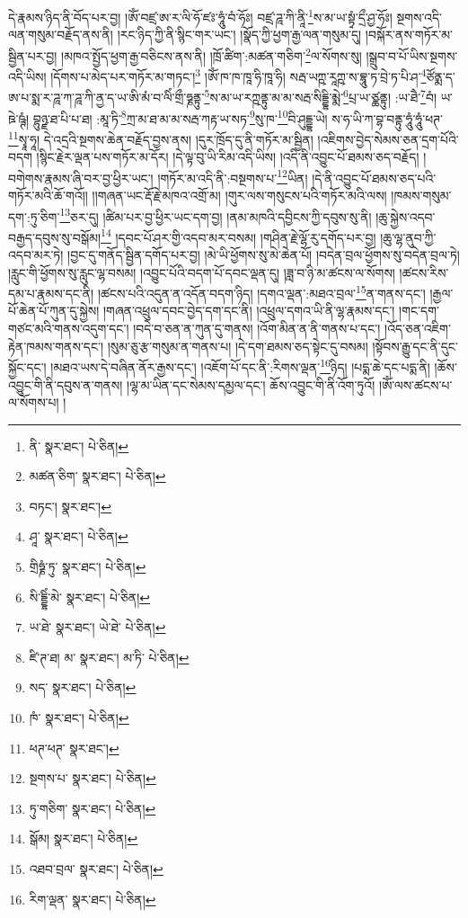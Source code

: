 དེ་རྣམས་ཉིད་ནི་བོད་པར་བྱ། །ཨོཾ་བཛྲ་ཨ་ར་ལི་ཧོ་ཛཿ་ཧཱུཾ་བཾ་ཧོཿ། བཛྲ་ཌཱ་ཀི་ནཱི་\footnote{ནི་  སྣར་ཐང་།  པེ་ཅིན། }ས་མ་ཡ་སྟྭཾ་དྲྀ་ཤྱ་ཧོཿ། སྔགས་འདི་ལན་གསུམ་བརྗོད་ནས་ནི། །རང་ཉིད་ཀྱི་ནི་སྙིང་གར་ཡང་། །སྣོད་ཀྱི་ཕྱག་རྒྱ་ལན་གསུམ་དུ། །བསྐོར་ནས་གཏོར་མ་སྦྱིན་པར་བྱ། །མཁའ་སྤྱོད་ཕྱག་རྒྱ་བཅིངས་ནས་ནི། །ཁྲོ་ཚིག་:མཚན་གཅིག་\footnote{མཚན་ཅིག་  སྣར་ཐང་།  པེ་ཅིན། }ལ་སོགས་སུ། །སྒྲུབ་བ་པོ་ཡིས་སྔགས་འདི་ཡིས། །དོགས་པ་མེད་པར་གཏོར་མ་གཏང་།\footnote{བཏང་།  སྣར་ཐང་། } །ཨོཾ་ཁ་ཁ་ཁཱ་ཧི་ཁཱ་ཧི། སརྦ་ཡཀྵ་རཱཀྵ་ས་བྷཱུ་ཏ་བྲེ་ཏ་པི་ཤ་\footnote{ཤཱ་  སྣར་ཐང་།  པེ་ཅིན། }ཙོནྨ་ད་ཨ་པ་སྨ་ར་ཌཱ་ཀ་ཌཱ་ཀི་ནྱ་ད་ཡ་ཨི་མཾ་བ་ལིཾ་གྲྀ་ཧྞནྟུ་\footnote{གྲིཧྞཾ་ཏུ་  སྣར་ཐང་།  པེ་ཅིན། }ས་མ་ཡ་རཀྵནྟུ་མ་མ་སརྦ་སིདྡྷི་མྨེ་\footnote{སི་དྡྷིཾ་མེ་  སྣར་ཐང་།  པེ་ཅིན། }པྲ་ཡ་ཙྪནྟུ། :ཡ་ཐཻ་\footnote{ཡ་ཐེ་  སྣར་ཐང་། ཡེ་ཐེ་  པེ་ཅིན། }བཾ། ཡ་ཋེ་ཥྚཾ། བྷུཉྫ་ཐ་པི་པ་ཐ། :མཱ་ཏི་\footnote{ཛི་ཊ་ཐ། མ་  སྣར་ཐང་། མ་ཏི་  པེ་ཅིན། }ཀྲ་མ་ཐ་མ་མ་སརྦ་ཀརྟ་ཡ་སཏ་\footnote{སད་  སྣར་ཐང་།  པེ་ཅིན། }སུ་ཁ་\footnote{ཁཾ་  སྣར་ཐང་།  པེ་ཅིན། }བི་ཤུདྡྷ་ཡེ། ས་ཧ་ཡི་ཀ་བྷ་བནྟུ་ཧཱུཾ་ཧཱུཾ་ཕཊ་\footnote{ཕཊ་ཕཊ་  སྣར་ཐང་། }སྭཱ་ཧཱ། དེ་འདྲའི་སྔགས་ཆེན་བརྗོད་བྱས་ནས། །དུར་ཁྲོད་དུ་ནི་གཏོར་མ་སྦྱིན། །འཇིགས་བྱེད་སེམས་ཅན་དྲག་པོའི་བདག །སྙིང་རྗེར་ལྡན་པས་གཏོར་མ་དོར། །དེ་ལྟ་བུ་ཡི་རིམ་འདི་ཡིས། །འདི་ནི་འབྱུང་པོ་ཐམས་ཅད་བརྗོད། །བགེགས་རྣམས་ཞི་བར་བྱ་ཕྱིར་ཡང་། །གཏོར་མ་འདི་ནི་:བསྔགས་པ་\footnote{སྔགས་པ་  སྣར་ཐང་།  པེ་ཅིན། }ཡིན། །དེ་ནི་འབྱུང་པོ་ཐམས་ཅད་པའི་གཏོར་མའི་ཆོ་གའོ།། །།གཞན་ཡང་རྡོ་རྗེ་མཁའ་འགྲོ་མ། །གུར་ལས་གསུངས་པའི་གཏོར་མའི་ལས། །ཁམས་གསུམ་དག་:ཏུ་ཅིག་\footnote{ཏུ་གཅིག་  སྣར་ཐང་།  པེ་ཅིན། }ཅར་དུ། །ཚིམ་པར་བྱ་ཕྱིར་ཡང་དག་བྱ། །ནམ་མཁའི་དབྱིངས་ཀྱི་དབུས་སུ་ནི། །ཆུ་སྐྱེས་འདབ་བརྒྱད་དབུས་སུ་བསྒོམ།\footnote{སྒོམ།  སྣར་ཐང་།  པེ་ཅིན། } །དབང་པོ་ཤར་གྱི་འདབ་མར་བསམ། །གཤིན་རྗེ་ལྷོ་རུ་དགོད་པར་བྱ། །ཆུ་ལྷ་ནུབ་ཀྱི་འདབ་མར་ཏེ། །བྱང་དུ་གནོད་སྦྱིན་དགོད་པར་བྱ། །མེ་ཡི་ཕྱོགས་སུ་མེ་ཆེན་པོ། །བདེན་བྲལ་ཕྱོགས་སུ་བདེན་བྲལ་ཏེ། །རླུང་གི་ཕྱོགས་སུ་རླུང་ལྷ་བསམ། །འབྱུང་པོའི་བདག་པོ་དབང་ལྡན་དུ། །ཟླ་བ་ཉི་མ་ཚངས་ལ་སོགས། །ཚངས་རིས་དམ་པ་རྣམས་དང་ནི། །ཚངས་པའི་འདུན་ན་འདོན་བདག་ཉིད། །དགའ་ལྡན་:མཐའ་བྲལ་\footnote{འཐབ་བྲལ་  སྣར་ཐང་།  པེ་ཅིན། }ན་གནས་དང་། །རྒྱལ་པོ་ཆེན་པོ་ཀུན་དུ་སྐྱེས། །གཞན་འཕྲུལ་དབང་བྱེད་དག་དང་ནི། །འཕྲུལ་དགའ་ཡི་ནི་ལྷ་རྣམས་དང་། །གང་དག་གཙང་མའི་གནས་འདུག་དང་། །བདེ་བ་ཅན་ན་ཀུན་དུ་གནས། །འོག་མིན་ན་ནི་གནས་པ་དང་། །འོད་ཅན་འཇིག་རྟེན་ཁམས་གནས་དང་། །སུམ་ཅུ་རྩ་གསུམ་ན་གནས་པ། །དེ་དག་ཐམས་ཅད་སྟེང་དུ་བསམ། །སྟོབས་རྒྱུ་དང་ནི་དུང་སྐྱོང་དང་། །མཐའ་ཡས་དེ་བཞིན་ནོར་རྒྱས་དང་། །འཇོག་པོ་དང་ནི་:རིགས་ལྡན་\footnote{རིག་ལྡན་  སྣར་ཐང་།  པེ་ཅིན། }ཉིད། །པདྨ་ཆེ་དང་པདྨ་ནི། །ཆོས་འབྱུང་གི་ནི་དབུས་ན་གནས། །ལྷ་མ་ཡིན་དང་སེམས་དམྱལ་དང་། ཆོས་འབྱུང་གི་ནི་འོག་ཏུའོ། །ཨོཾ་ལས་ཚངས་པ་ལ་སོགས་པ། །
